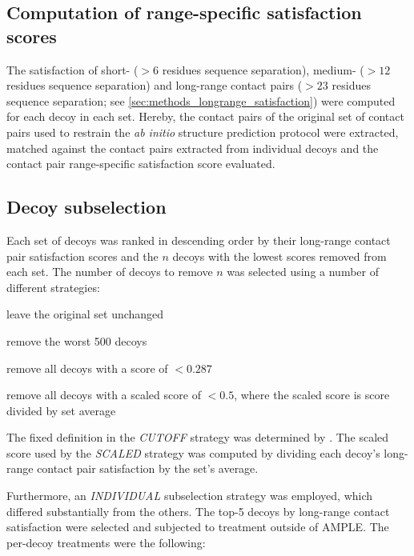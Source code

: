 \subsection{Computation of range-specific satisfaction scores}
The satisfaction of short- ($>6$ residues sequence separation), medium- ($>12$ residues sequence separation) and long-range contact pairs ($>23$ residues sequence separation; see \cref{sec:methods_longrange_satisfaction}) were computed for each decoy in each set. Hereby, the contact pairs of the original set of contact pairs used to restrain the \textit{ab initio} structure prediction protocol were extracted, matched against the contact pairs extracted from individual decoys and the contact pair range-specific satisfaction score evaluated. 

\subsection{Decoy subselection} \label{sec:ample_decoys_decoy_selection}
Each set of decoys was ranked in descending order by their long-range contact pair satisfaction scores and the $n$ decoys with the lowest scores removed from each set. The number of decoys to remove $n$ was selected using a number of different strategies:

\begin{description}[style=multiline,leftmargin=3cm]
    \item[\textit{NONE}] leave the original set unchanged
    \item[\textit{LINEAR}] remove the worst 500 decoys
    \item[\textit{CUTOFF}] remove all decoys with a score of $<0.287$ 
    \item[\textit{SCALED}] remove all decoys with a scaled score of $<0.5$, where the scaled score is score divided by set average
\end{description}

The fixed definition in the \textit{CUTOFF} strategy was determined by \textcite{De_Oliveira2017-gj}. The scaled score used by the \textit{SCALED} strategy was computed by dividing each decoy's long-range contact pair satisfaction by the set's average.

Furthermore, an \textit{INDIVIDUAL} subselection strategy was employed, which differed substantially from the others. The top-5 decoys by long-range contact satisfaction were selected and subjected to treatment outside of AMPLE. The per-decoy treatments were the following:

